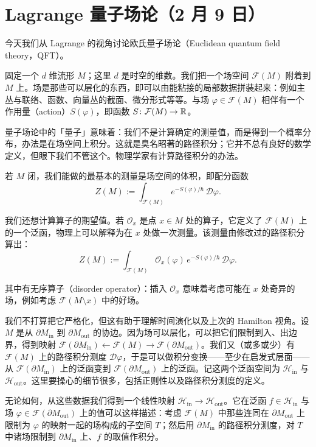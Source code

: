 \section[Lagrange 量子场论]{Lagrange 量子场论（2 月 9 日）}


今天我们从 Lagrange 的视角讨论欧氏量子场论（Euclidean quantum field theory，QFT）。

固定一个 $d$ 维流形 $M$；这里 $d$ 是时空的维数。我们把一个场空间 $\mathcal{F}(M)$ 附着到 $M$ 上。场是那些可以层化的东西，即可以由能粘接的局部数据拼装起来：例如主丛与联络、函数、向量丛的截面、微分形式等等。与场 $\varphi\in\mathcal{F}(M)$ 相伴有一个作用量（action）$S(\varphi)$，即函数 $S\colon\mathcal{F}(M)\to\mathbb{R}$。

量子场论中的「量子」意味着：我们不是计算确定的测量值，而是得到一个概率分布，办法是在场空间上积分。这就是臭名昭著的路径积分；它并不总有良好的数学定义，但眼下我们不管这个。物理学家有计算路径积分的办法。

若 $M$ 闭，我们能做的最基本的测量是场空间的体积，即配分函数
\[
  Z(M) := \int_{\mathcal{F}(M)} e^{-S(\varphi)/\hbar}\,\mathcal{D}\varphi.
\]

我们还想计算算子的期望值。若 $\mathcal{O}_x$ 是点 $x\in M$ 处的算子，它定义了 $\mathcal{F}(M)$ 上的一个泛函，物理上可以解释为在 $x$ 处做一次测量。该测量由修改过的路径积分算出：
\[
  Z(M) := \int_{\mathcal{F}(M)} \mathcal{O}_x(\varphi)\, e^{-S(\varphi)/\hbar}\,\mathcal{D}\varphi.
\]

其中有无序算子（disorder operator）：插入 $\mathcal{O}_x$ 意味着考虑可能在 $x$ 处奇异的场，例如考虑 $\mathcal{F}(M\setminus x)$ 中的好场。


我们不打算把它严格化，但这有助于理解时间演化以及上次的 Hamilton 视角。设 $M$ 是从 $\partial M_{\mathrm{in}}$ 到 $\partial M_{\mathrm{out}}$ 的协边。因为场可以层化，可以把它们限制到入、出边界，得到映射 $\mathcal{F}(\partial M_{\mathrm{in}})\leftarrow\mathcal{F}(M)\to\mathcal{F}(\partial M_{\mathrm{out}})$。我们又（或多或少）有 $\mathcal{F}(M)$ 上的路径积分测度 $\mathcal{D}\varphi$，于是可以做积分变换——至少在启发式层面——从 $\mathcal{F}(\partial M_{\mathrm{in}})$ 上的泛函变到 $\mathcal{F}(\partial M_{\mathrm{out}})$ 上的泛函。记这两个泛函空间为 $\mathcal{H}_{\mathrm{in}}$ 与 $\mathcal{H}_{\mathrm{out}}$。这里要操心的细节很多，包括正则性以及路径积分测度的定义。

无论如何，从这些数据我们得到一个线性映射 $\mathcal{H}_{\mathrm{in}}\to\mathcal{H}_{\mathrm{out}}$。它在泛函 $f\in\mathcal{H}_{\mathrm{in}}$ 与场 $\varphi\in\mathcal{F}(\partial M_{\mathrm{out}})$ 上的值可以这样描述：考虑 $\mathcal{F}(M)$ 中那些连同在 $\partial M_{\mathrm{out}}$ 上限制为 $\varphi$ 的映射一起的场构成的子空间 $T$；然后用 $\partial M_{\mathrm{in}}$ 的路径积分测度，对 $T$ 中诸场限制到 $\partial M_{\mathrm{in}}$ 上、$f$ 的取值作积分。

